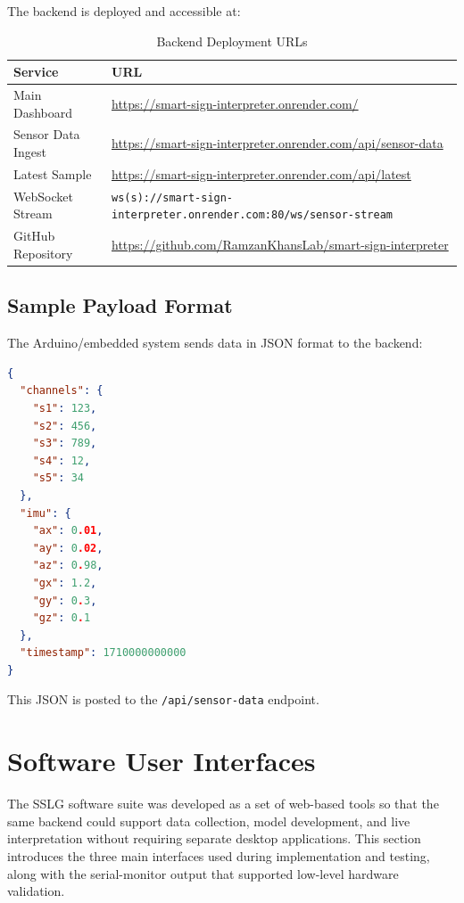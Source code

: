 \documentclass[12pt,a4paper]{report}
\newcommand{\CodeRepoUrl}{https://github.com/RamzanKhansLab/smart-sign-interpreter}
\newcommand{\BackendURL}{https://smart-sign-interpreter.onrender.com}
\begin{document}
The backend is deployed and accessible at:

\begin{table}[H]
  \centering
  \caption{Backend Deployment URLs}
  \label{tab:backend_urls}
  \begin{tabular}{>{\raggedright\arraybackslash}p{} >{\raggedright\arraybackslash}p{}}
    \toprule
    \textbf{Service} & \textbf{URL} \\
    \midrule
    Main Dashboard & \url{\BackendURL/} \\
    Sensor Data Ingest & \url{\BackendURL/api/sensor-data} \\
    Latest Sample & \url{\BackendURL/api/latest} \\
    WebSocket Stream & \texttt{ws(s)://smart-sign-interpreter.onrender.com:80/ws/sensor-stream} \\
    GitHub Repository & \url{\CodeRepoUrl} \\
    \bottomrule
  \end{tabular}
\end{table}

\subsection{Sample Payload Format}

The Arduino/embedded system sends data in JSON format to the backend:

\begin{lstlisting}[language=json, caption=Sensor Data Payload Format]
{
  "channels": {
    "s1": 123,
    "s2": 456,
    "s3": 789,
    "s4": 12,
    "s5": 34
  },
  "imu": {
    "ax": 0.01,
    "ay": 0.02,
    "az": 0.98,
    "gx": 1.2,
    "gy": 0.3,
    "gz": 0.1
  },
  "timestamp": 1710000000000
}
\end{lstlisting}

This JSON is posted to the \texttt{/api/sensor-data} endpoint.

\section{Software User Interfaces}
\label{sec:impl_ui}

The SSLG software suite was developed as a set of web-based tools so that the same backend could support data collection, model development, and live interpretation without requiring separate desktop applications. This section introduces the three main interfaces used during implementation and testing, along with the serial-monitor output that supported low-level hardware validation.
\end{document}

